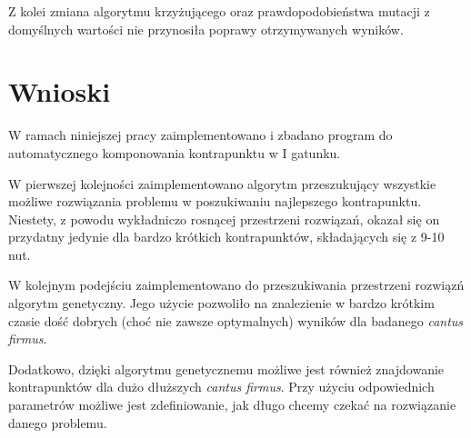 \documentclass{article}
\begin{document}
Z kolei zmiana algorytmu krzyżującego oraz prawdopodobieństwa mutacji z domyślnych wartości nie przynosiła poprawy otrzymywanych wyników.

\section{Wnioski}

W ramach niniejszej pracy zaimplementowano i zbadano program do automatycznego komponowania kontrapunktu w I gatunku.

W pierwszej kolejności zaimplementowano algorytm przeszukujący wszystkie możliwe rozwiązania problemu w poszukiwaniu najlepszego kontrapunktu. Niestety, z powodu wykładniczo rosnącej przestrzeni rozwiązań, okazał się on przydatny jedynie dla bardzo krótkich kontrapunktów, składających się z 9-10 nut.

W kolejnym podejściu zaimplementowano do przeszukiwania przestrzeni rozwiązń algorytm genetyczny. Jego użycie pozwoliło na znalezienie w bardzo krótkim czasie dość dobrych (choć nie zawsze optymalnych) wyników dla badanego \emph{cantus firmus}.

Dodatkowo, dzięki algorytmu genetycznemu możliwe jest również znajdowanie kontrapunktów dla dużo dłuższych \emph{cantus firmus}. Przy użyciu odpowiednich parametrów możliwe jest zdefiniowanie, jak długo chcemy czekać na rozwiązanie danego problemu.

\clearpage



\end{document}
